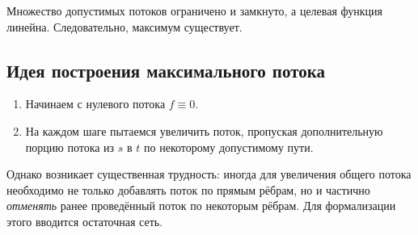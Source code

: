 \begin{Remark}{}{}
	Множество допустимых потоков ограничено и замкнуто, а целевая функция линейна. Следовательно, максимум существует.
\end{Remark}

\subsection{Идея построения максимального потока}

\begin{enumerate}[label=\arabic*)]
	\item Начинаем с нулевого потока $f\equiv 0$.
	\item На каждом шаге пытаемся увеличить поток, пропуская дополнительную порцию потока из $s$ в $t$ по некоторому допустимому пути.
\end{enumerate}

Однако возникает существенная трудность: иногда для увеличения общего потока необходимо не только добавлять поток по прямым рёбрам, но и частично \emph{отменять} ранее проведённый поток по некоторым рёбрам. Для формализации этого вводится остаточная сеть.

